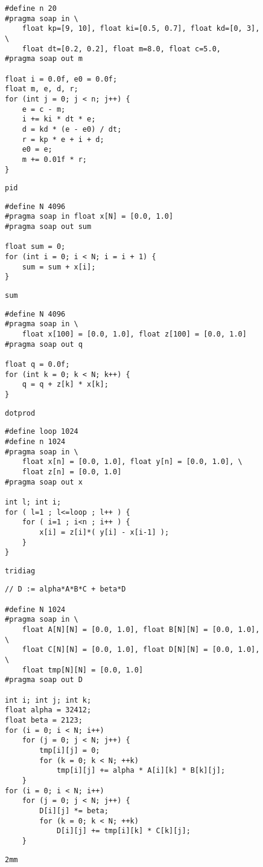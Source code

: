 \begin{figure}[ht]
\begin{lstlisting}
#define n 20
#pragma soap in \
    float kp=[9, 10], float ki=[0.5, 0.7], float kd=[0, 3], \
    float dt=[0.2, 0.2], float m=8.0, float c=5.0,
#pragma soap out m

float i = 0.0f, e0 = 0.0f;
float m, e, d, r;
for (int j = 0; j < n; j++) {
    e = c - m;
    i += ki * dt * e;
    d = kd * (e - e0) / dt;
    r = kp * e + i + d;
    e0 = e;
    m += 0.01f * r;
}
\end{lstlisting}
\caption{\texttt{pid}}
\end{figure}


\begin{figure}[ht]
\begin{lstlisting}
#define N 4096
#pragma soap in float x[N] = [0.0, 1.0]
#pragma soap out sum

float sum = 0;
for (int i = 0; i < N; i = i + 1) {
    sum = sum + x[i];
}
\end{lstlisting}
\caption{\texttt{sum}}
\end{figure}


\begin{figure}[ht]
\begin{lstlisting}
#define N 4096
#pragma soap in \
    float x[100] = [0.0, 1.0], float z[100] = [0.0, 1.0]
#pragma soap out q

float q = 0.0f;
for (int k = 0; k < N; k++) {
    q = q + z[k] * x[k];
}
\end{lstlisting}
\caption{\texttt{dotprod}}
\end{figure}


\begin{figure}[ht]
\begin{lstlisting}
#define loop 1024
#define n 1024
#pragma soap in \
    float x[n] = [0.0, 1.0], float y[n] = [0.0, 1.0], \
    float z[n] = [0.0, 1.0]
#pragma soap out x

int l; int i;
for ( l=1 ; l<=loop ; l++ ) {
    for ( i=1 ; i<n ; i++ ) {
        x[i] = z[i]*( y[i] - x[i-1] );
    }
}
\end{lstlisting}
\caption{\texttt{tridiag}}
\end{figure}


\begin{figure}[ht]
\begin{lstlisting}
// D := alpha*A*B*C + beta*D

#define N 1024
#pragma soap in \
    float A[N][N] = [0.0, 1.0], float B[N][N] = [0.0, 1.0], \
    float C[N][N] = [0.0, 1.0], float D[N][N] = [0.0, 1.0], \
    float tmp[N][N] = [0.0, 1.0]
#pragma soap out D

int i; int j; int k;
float alpha = 32412;
float beta = 2123;
for (i = 0; i < N; i++)
    for (j = 0; j < N; j++) {
        tmp[i][j] = 0;
        for (k = 0; k < N; ++k)
            tmp[i][j] += alpha * A[i][k] * B[k][j];
    }
for (i = 0; i < N; i++)
    for (j = 0; j < N; j++) {
        D[i][j] *= beta;
        for (k = 0; k < N; ++k)
            D[i][j] += tmp[i][k] * C[k][j];
    }
\end{lstlisting}
\caption{\texttt{2mm}}
\end{figure}


